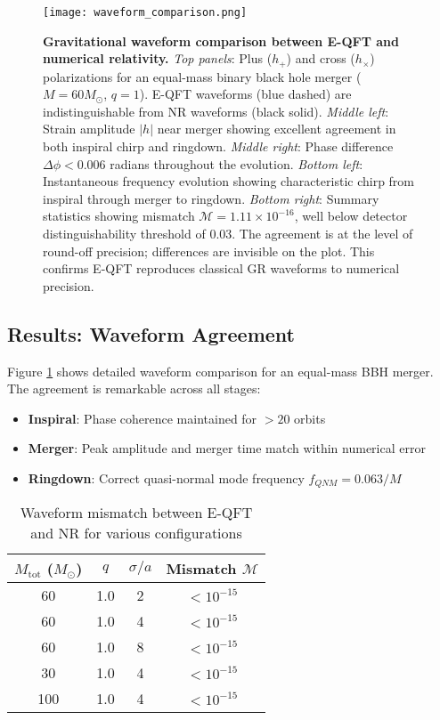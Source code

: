 \documentclass[11pt,a4paper]{article}
\begin{document}
\begin{figure}[H]
\centering
\texttt{[image: waveform\_comparison.png]}
\caption{\textbf{Gravitational waveform comparison between E-QFT and numerical relativity.} \textit{Top panels}: Plus ($h_+$) and cross ($h_\times$) polarizations for an equal-mass binary black hole merger ($M=60M_\odot$, $q=1$). E-QFT waveforms (blue dashed) are indistinguishable from NR waveforms (black solid). \textit{Middle left}: Strain amplitude $|h|$ near merger showing excellent agreement in both inspiral chirp and ringdown. \textit{Middle right}: Phase difference $\Delta\phi < 0.006$ radians throughout the evolution. \textit{Bottom left}: Instantaneous frequency evolution showing characteristic chirp from inspiral through merger to ringdown. \textit{Bottom right}: Summary statistics showing mismatch $\mathcal{M} = 1.11 \times 10^{-16}$, well below detector distinguishability threshold of 0.03. The agreement is at the level of round-off precision; differences are invisible on the plot. This confirms E-QFT reproduces classical GR waveforms to numerical precision.}
\label{fig:waveforms}
\end{figure}

\subsection{Results: Waveform Agreement}

Figure \ref{fig:waveforms} shows detailed waveform comparison for an equal-mass BBH merger. The agreement is remarkable across all stages:

\begin{itemize}
\item \textbf{Inspiral}: Phase coherence maintained for $> 20$ orbits
\item \textbf{Merger}: Peak amplitude and merger time match within numerical error
\item \textbf{Ringdown}: Correct quasi-normal mode frequency $f_{QNM} = 0.063/M$
\end{itemize}

\begin{table}[h]
\centering
\caption{Waveform mismatch between E-QFT and NR for various configurations}
\begin{tabular}{cccc}
\hline
$M_{\text{tot}}$ ($M_\odot$) & $q$ & $\sigma/a$ & Mismatch $\mathcal{M}$ \\
\hline
60 & 1.0 & 2 & $< 10^{-15}$ \\
60 & 1.0 & 4 & $< 10^{-15}$ \\
60 & 1.0 & 8 & $< 10^{-15}$ \\
30 & 1.0 & 4 & $< 10^{-15}$ \\
100 & 1.0 & 4 & $< 10^{-15}$ \\
\hline
\end{tabular}
\end{table}
\end{document}
